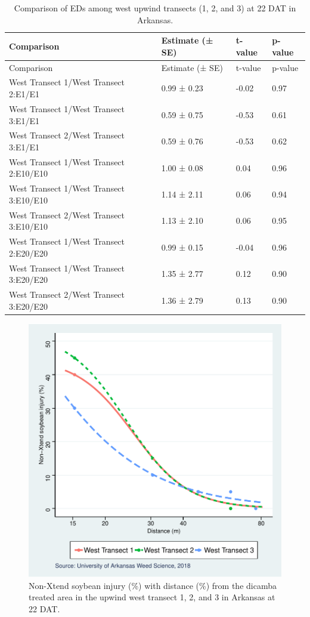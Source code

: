 \documentclass[]{article}
\begin{document}
\begin{longtable}[]{@{}llll@{}}
\caption{Comparison of EDs among west upwind transects (1, 2, and 3) at
22 DAT in Arkansas.}\tabularnewline
\toprule
Comparison & Estimate (± SE) & t-value & p-value\tabularnewline
\midrule
\endfirsthead
\toprule
Comparison & Estimate (± SE) & t-value & p-value\tabularnewline
\midrule
\endhead
West Transect 1/West Transect 2:E1/E1 & 0.99 ± 0.23 & -0.02 &
0.97\tabularnewline
West Transect 1/West Transect 3:E1/E1 & 0.59 ± 0.75 & -0.53 &
0.61\tabularnewline
West Transect 2/West Transect 3:E1/E1 & 0.59 ± 0.76 & -0.53 &
0.62\tabularnewline
West Transect 1/West Transect 2:E10/E10 & 1.00 ± 0.08 & 0.04 &
0.96\tabularnewline
West Transect 1/West Transect 3:E10/E10 & 1.14 ± 2.11 & 0.06 &
0.94\tabularnewline
West Transect 2/West Transect 3:E10/E10 & 1.13 ± 2.10 & 0.06 &
0.95\tabularnewline
West Transect 1/West Transect 2:E20/E20 & 0.99 ± 0.15 & -0.04 &
0.96\tabularnewline
West Transect 1/West Transect 3:E20/E20 & 1.35 ± 2.77 & 0.12 &
0.90\tabularnewline
West Transect 2/West Transect 3:E20/E20 & 1.36 ± 2.79 & 0.13 &
0.90\tabularnewline
\bottomrule
\end{longtable}

\begin{figure}
\centering
\includegraphics{Report_Dicamba_study_files/figure-latex/unnamed-chunk-9-1.pdf}
\caption{Non-Xtend soybean injury (\%) with distance (\%) from the
dicamba treated area in the upwind west transect 1, 2, and 3 in Arkansas
at 22 DAT.}
\end{figure}
\end{document}
